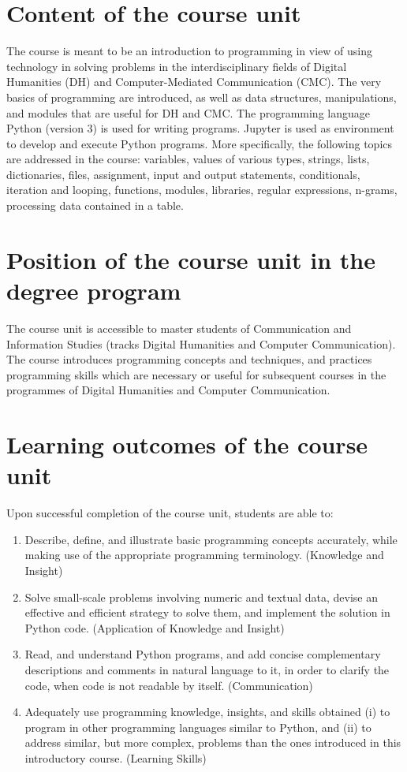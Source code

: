 \documentclass[a4paper,12pt]{article}
\begin{document}
\section{Content of the course unit}

The course is meant to be an introduction to programming in view of using
technology in solving problems in the interdisciplinary fields of Digital
Humanities (DH) and Computer-Mediated Communication (CMC). The very basics of
programming are introduced, as well as data structures, manipulations, and
modules that are useful for DH and CMC. The programming language Python
(version 3) is used for writing programs. Jupyter is used as environment to
develop and execute Python programs. More specifically, the following topics
are addressed in the course: variables, values of various types, strings,
lists, dictionaries, files, assignment, input and output statements,
conditionals, iteration and looping, functions, modules, libraries, regular
expressions, n-grams, processing data contained in a table.

\section{Position of the course unit in the degree program}
The course unit is accessible to master students of Communication and
Information Studies (tracks Digital Humanities and Computer Communication).
The course introduces programming concepts and techniques, and practices
programming skills which are necessary or useful for subsequent courses in the
programmes of Digital Humanities and Computer Communication.

\section{Learning outcomes of the course unit}

Upon successful completion of the course unit, students are able to:
\begin{enumerate}
    \item Describe, define, and illustrate basic programming concepts
        accurately, while making use of the appropriate programming
        terminology. (Knowledge and Insight)
    \item Solve small-scale problems involving numeric and textual data,
        devise an effective and efficient strategy to solve them,
        and implement the solution in Python code.
        (Application of Knowledge and Insight)
    \item Read, and understand Python programs, and add concise complementary
        descriptions and comments in natural language to it, in order to
        clarify the code, when code is not readable by itself. (Communication)
    \item Adequately use programming knowledge, insights, and skills obtained
        (i) to program in other programming languages similar to Python, and
        (ii) to address similar, but more complex, problems than the ones
        introduced in this introductory course. (Learning Skills)
\end{enumerate}
\end{document}
